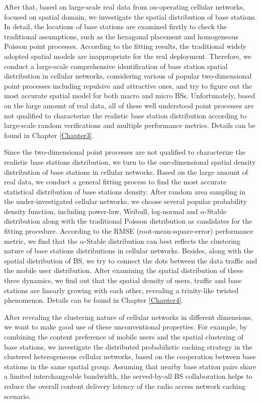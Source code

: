 After that, based on large-scale real data from on-operating cellular networks, focused on spatial domain, we investigate the spatial distribution of base stations. In detail, the locations of base stations are examined firstly to check the traditional assumptions, such as the hexagonal placement and homogeneous Poisson point processes. According to the fitting results, the traditional widely adopted spatial models are inappropriate for the real deployment. Therefore, we conduct a large-scale comprehensive identification of base station spatial distribution in cellular networks, considering various of popular two-dimensional point processes including repulsive and attractive ones, and try to figure out the most accurate spatial model for both macro and micro BSs. Unfortunately, based on the large amount of real data, all of these well understood point processes are not qualified to characterize the realistic base station distribution according to large-scale random verifications and multiple performance metrics. Details can be found in Chapter \ref{Chapter3}.

Since the two-dimensional point processes are not qualified to characterize the realistic base stations distribution, we turn to the one-dimensional spatial density distribution of base stations in cellular networks. Based on the large amount of real data, we conduct a general fitting process to find the most accurate statistical distribution of base stations density. After random area sampling in the under-investigated cellular networks, we choose several popular probability density function, including power-law, Weibull, log-normal and $\alpha$-Stable distribution along with the traditional Poisson distribution as candidates for the fitting procedure. According to the RMSE (root-mean-square-error) performance metric, we find that the $\alpha$-Stable distribution can best reflects the clustering nature of base stations distributions in cellular networks. Besides, along with the spatial distribution of BS, we try to connect the dots between the data traffic and the mobile user distribution. After examining the spatial distribution of these three dynamics, we find out that the spatial density of users, traffic and base stations are linearly growing with each other, revealing a trinity-like twisted phenomenon. Details can be found in Chapter \ref{Chapter4}.

After revealing the clustering nature of cellular networks in different dimensions, we want to make good use of these unconventional properties. For example, by combining the content preference of mobile users and the spatial clustering of base stations, we investigate the distributed probabilistic caching strategy in the clustered heterogeneous cellular networks, based on the cooperation between base stations in the same spatial group. Assuming that nearby base station pairs share a limited interchangeable bandwidth, the served-by-all BS collaboration helps to reduce the overall content delivery latency of the radio access network caching scenario.

